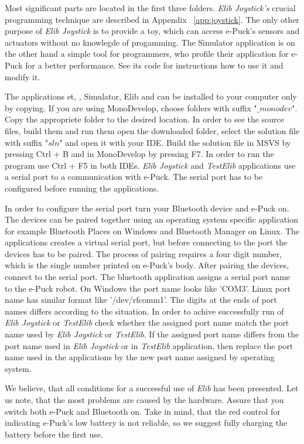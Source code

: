 	Most significant parts are located in the first three folders.
	{\it Elib Joystick's} crucial programming technique are described in Appendix ~\ref{app:joystick}.
	The only other purpose of {\it Elib Joystick} is to provide a toy, which can access e-Puck's sensors and actuators without no knowlegde of progamming.
	The Simulator application is on the other hand a simple tool for programmers, who profile their application for e-Puck for a better performance.
	See its code for instructions how to use it and modify it.

	The applications {\sf et}, {}, {\sf Simulator}, {\sf Elib} and {}
	can be installed to your computer only by copying.
	If you are using MonoDevelop, choose folders with suffix "$\_monodev$". 
	Copy the appropriete folder to the desired location.
	In order to see the source files, build them and run them open the downloaded folder, select the solution file with suffix "$sln$" and open it with your IDE.
	Build the solution file in MSVS by pressing Ctrl + B and in MonoDevelop by pressing F7. 
	In order to run the program use Ctrl + F5 in both IDEs.
	{\it Elib Joystick} and {\it TestElib} applications use a serial port to a communication with e-Puck. 
	The serial port has to be configured before running the applications.

	In order to configure the serial port turn your Bluetooth device and e-Puck on. 
	The devices can be paired together using an operating system specific application 
	for example Bluetooth Places on Windows and Bluetooth Manager on Linux. 
	The applications creates a virtual serial port, but before connecting to the port
	the devices has to be paired.
	The process of pairing requires a four digit number, 
	which is the single number printed on e-Puck's body.
	After pairing the devices, connect to the serial port.
	The bluetooth application assigns a serial port name to the e-Puck robot. 
	On Windows the port name looks like 'COM3'. 
	Linux port name has similar format like '/dev/rfcomm1'.
	The digits at the ends of port names differs according to the situation.
	In order to achive successfully run of {\it Elib Joystick} or {\it TestElib} check
	whether the assigned port name match the port name used by {\it Elib Joystick} or {\it TestElib}.
	If the assigned port name differs from the port name used in {\it Elib Joystick}
	or in {\it TestElib} application, then replace the port name used in the applications by
	the new port name assigned by operating system.

	We believe, that all conditions for a successful use  of {\it Elib} has been presented. 
	Let us note, that the most problems are caused by the hardware.
	Assure that you switch both e-Puck and Bluetooth on. Take in mind, 
	that the red control for indicating e-Puck's low battery is not reliable,
	so we suggest fully charging the battery before the first use.

